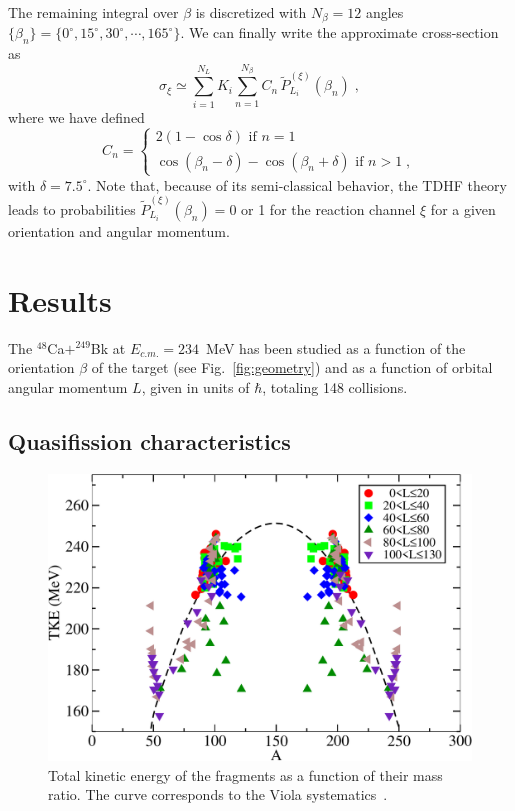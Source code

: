 The remaining integral over $\beta$ is discretized with $N_\beta=12$ angles $\{\beta_n\}=\{0^{\circ},15^{\circ},30^{\circ},\cdots ,165^{\circ}\}$.
We can finally write the approximate cross-section as
\begin{equation}
\sigma_\xi\simeq \sum_{i=1}^{N_L}K_i \sum_{n=1}^{N_\beta} C_n\, \tilde{P}^{(\xi)}_{L_i}(\beta_n)\;,
\end{equation}
where we have defined
$$C_n=\begin{cases}
2(1-\cos\delta) \mbox{~if~} n=1\\
\cos(\beta_n-\delta)-\cos(\beta_n+\delta) \mbox{~if~} n>1 \;,
\end{cases}
$$
with $\delta=7.5^{\circ}$.
Note that, because of its semi-classical behavior, the TDHF theory leads to probabilities $\tilde{P}^{(\xi)}_{L_i}(\beta_n)=0$ or 1 for the reaction channel $\xi$ for a given orientation and angular momentum.

\section{Results}\label{sec:results}

The $^{48}$Ca$+^{249}$Bk at $E_{c.m.}=234$~MeV has been studied as a function of the orientation $\beta$ of the target (see Fig.~\ref{fig:geometry}) and as a function of orbital angular momentum $L$, given in units of $\hbar$, totaling 148 collisions.

\subsection{Quasifission characteristics}
\begin{figure}
	\includegraphics*[width=\textwidth]{../Figures/CaBk/MED.pdf}
	\caption{Total kinetic energy of the fragments as a function of their mass ratio. The curve corresponds to the Viola systematics~\citep{viola1985,hinde1987}.}
	\label{fig:MED}
\end{figure}

